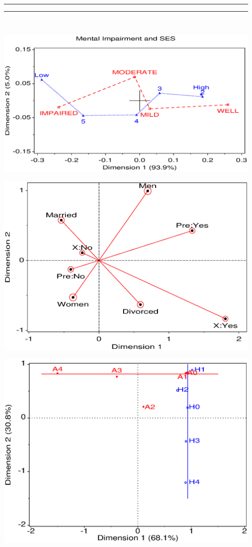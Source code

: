\begin{center}
 \rule[-4pt]{0.5pt}{4pt}\hrulefill\rule[-4pt]{0.5pt}{4pt}\\
 \begin{minipage}[c]{.33\linewidth}
  \includegraphics[width=1\linewidth,clip=true]{ch5/fig/correses}
 \end{minipage}%
 \hfill
 \begin{minipage}[c]{.33\linewidth}
  \includegraphics[width=1\linewidth,clip=true]{ch5/fig/mcamarital1}
 \end{minipage}
 \hfill
 \begin{minipage}[c]{.33\linewidth}
  \includegraphics[width=1\linewidth,clip=true]{ch5/fig/soccer3}
 \end{minipage}
\end{center}

